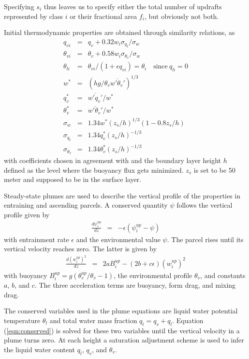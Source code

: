 \documentclass[dvipdfmx,a4paper,10pt]{article}
\begin{document}
Specifying $s_i$ thus leaves us to specify either the total number of updrafts represented by class $i$ or their fractional area $f_i$, but obviously not both.

Initial thermodynamic properties are obtained through similarity relations, as 
\begin{eqnarray}
 q_{vi}&=&q_{v}+0.32 w_i  \sigma_{q_t}/\sigma_w\\
 \theta_{vi}&=&\theta_{v}+0.58 w_i  \sigma_{\theta_v}/\sigma_w\\
  \theta_{li}&=&\theta_{vi}/(1+\epsilon q_{vi})=\theta_i \quad\mathrm{since}~q_{li}=0\\
  w^*&=&(hg/\theta_v \overline{w'\theta_v'})^{1/3}\\
  q_v^*&=&\overline{w'q_v'}/w^*\\
  \theta_v^*&=&\overline{w'\theta_v'}/w^*\\
 \sigma_w&=&1.34 w^*(z_s/h)^{1/3} (1-0.8z_s/h)\\
   \sigma_{q_t}&=&1.34 q_v^* (z_s/h)^{-1/3}\\
  \sigma_{\theta_v}&=&1.34\theta_v^* (z_s/h)^{-1/3}
\end{eqnarray}
with coefficients chosen in agreement with \cite{lenschow80} and the boundary layer height $h$ defined as the level where the buoyancy flux gets minimized. $z_s$ is set to be 50 meter and supposed to be in the surface layer. 

Steady-state plumes are used to describe the vertical profile of the properties in entraining and ascending parcels. A conserved quantity $\psi$ follows the vertical profile given by
\begin{eqnarray}\label{eqn:conserved}
 \frac{d\psi_i^{up} }{d z } &=& - \epsilon(\psi_i^{up} - \psi)
\end{eqnarray}
with entrainment rate $\epsilon$ and the environmental value $\psi$. The parcel rises until its vertical velocity reaches zero. The latter is given by
\begin{eqnarray}\label{eqn:w}
 \frac{d (w_i^{up})^2 }{d z } &=& 2aB^{up}_i- (2b+c\epsilon)(w_i^{up})^2
\end{eqnarray}
with buoyancy $B_i^{up}=g(\theta_v^{up}/\theta_v-1)$, the environmental profile $\theta_v$, and constants $a$, $b$, and $c$. The three acceleration terms are buoyancy, form drag, and mixing drag. 


The conserved variables used in the plume equations are liquid water potential temperature $\theta_l$ and total water mass fraction $q_t=q_v+q_l$. Equation (\ref{eqn:conserved}) is solved for these two variables until the vertical velocity in a plume turns zero. At each height a saturation adjustment scheme is used to infer the liquid water content $q_l$, $q_v$, and $\theta_v$. 
\end{document}
